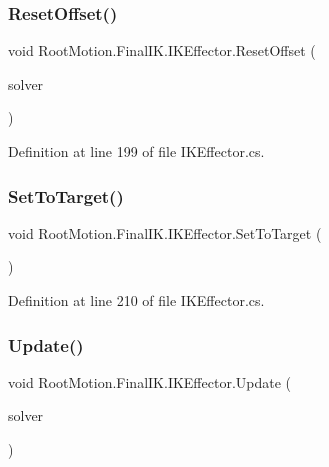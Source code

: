 \subsubsection{\texorpdfstring{Reset\+Offset()}{ResetOffset()}}
{\footnotesize\ttfamily void Root\+Motion.\+Final\+I\+K.\+I\+K\+Effector.\+Reset\+Offset (\begin{DoxyParamCaption}\item[{\mbox{\hyperlink{class_root_motion_1_1_final_i_k_1_1_i_k_solver_full_body}{I\+K\+Solver\+Full\+Body}}}]{solver }\end{DoxyParamCaption})}



Definition at line 199 of file I\+K\+Effector.\+cs.

\mbox{\label{class_root_motion_1_1_final_i_k_1_1_i_k_effector_aaade6c51db820a652116e4a8048d19e1}} 
\subsubsection{\texorpdfstring{Set\+To\+Target()}{SetToTarget()}}
{\footnotesize\ttfamily void Root\+Motion.\+Final\+I\+K.\+I\+K\+Effector.\+Set\+To\+Target (\begin{DoxyParamCaption}{ }\end{DoxyParamCaption})}



Definition at line 210 of file I\+K\+Effector.\+cs.

\mbox{\label{class_root_motion_1_1_final_i_k_1_1_i_k_effector_a68357766a32e45dd3f6ba4860b0d88e6}} 
\subsubsection{\texorpdfstring{Update()}{Update()}}
{\footnotesize\ttfamily void Root\+Motion.\+Final\+I\+K.\+I\+K\+Effector.\+Update (\begin{DoxyParamCaption}\item[{\mbox{\hyperlink{class_root_motion_1_1_final_i_k_1_1_i_k_solver_full_body}{I\+K\+Solver\+Full\+Body}}}]{solver }\end{DoxyParamCaption})}



